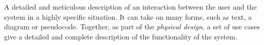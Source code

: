 \begin{tool} \label{tool:use_case} 
  A detailed and meticulous description of an interaction between the user and the system in a highly specific situation. It can take on many forms, such as text, a diagram or pseudocode. Together, as part of the \emph{physical design}, a set of use cases give a detailed and complete description of the functionality of the system. \cite[p. 65]{benyon_14}
\end{tool}
